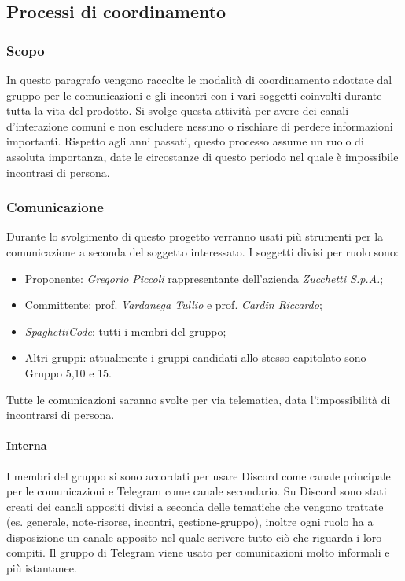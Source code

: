 \documentclass[../norme_di_progetto.tex]{subfiles}
\begin{document}
\subsection{Processi di coordinamento}

    \subsubsection{Scopo}
    In questo paragrafo vengono raccolte le modalità di coordinamento adottate dal gruppo per le comunicazioni e gli incontri  con i vari soggetti coinvolti durante tutta la vita del prodotto. Si svolge questa attività per avere dei canali d'interazione comuni e non escludere nessuno o rischiare di perdere informazioni importanti. Rispetto agli anni passati, questo processo assume un ruolo di assoluta importanza, date le circostanze di questo periodo nel quale è impossibile incontrasi di persona.

    \subsubsection{Comunicazione}
    Durante lo svolgimento di questo progetto verranno usati più strumenti per la comunicazione a seconda del soggetto interessato. I soggetti divisi per ruolo sono:
    \begin{itemize}
        \item Proponente: \emph{Gregorio Piccoli} rappresentante dell'azienda \emph{Zucchetti S.p.A.};
        \item Committente: prof. \emph{Vardanega Tullio} e prof. \emph{Cardin Riccardo};
        \item \emph{SpaghettiCode}: tutti i membri del gruppo;
        \item Altri gruppi: attualmente i gruppi candidati allo stesso capitolato sono Gruppo 5,10 e 15.
    \end{itemize}
    Tutte le comunicazioni saranno svolte per via telematica, data l'impossibilità di incontrarsi di persona.
        \paragraph{Interna}
        I membri del gruppo si sono accordati per usare Discord come canale principale per le comunicazioni e Telegram come canale secondario. Su Discord sono stati creati dei canali appositi divisi a seconda delle tematiche che vengono trattate (es. generale, note-risorse, incontri, gestione-gruppo), inoltre ogni ruolo ha a disposizione un canale apposito nel quale scrivere tutto ciò che riguarda i loro compiti. Il gruppo di Telegram viene usato per comunicazioni molto informali e più istantanee.
\end{document}
